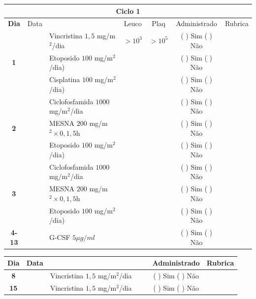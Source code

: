 \documentclass[11pt,a4paper,oldfontcommands]{memoir}
\begin{document}
\begin{center}
\begin{longtable}{p{1cm}c|p{5cm}|p{1.5cm}p{1.5cm}|c|c}
	\hline
	\multicolumn{7}{c}{Ciclo 1} \\
	\hline
	\multicolumn{1}{c|}{\multirow{1}{*}{\textbf{Dia}}}&{Data}&{}&\multicolumn{1}{c|}{Leuco}&\multicolumn{1}{c|}{Plaq}&{Administrado}&{Rubrica} \\
    \hline
    \multicolumn{1}{c|}{\multirow{3}{*}{\textbf{1}}}&&{Vincristina \(1,5\) mg/m\(^2\)/dia}&\multicolumn{1}{c|}{\(>10^3\)}&\multicolumn{1}{c|}{\(>10^5\)}&{(  ) Sim (  ) Não}&\\
    \cline{4-5}
    \multicolumn{1}{c|}{}&&{Etoposido \(100\) mg/m\(^2\)/dia)}&&&{(  ) Sim (  ) Não}&\\
    \cline{4-5}
    \multicolumn{1}{c|}{}&\multirow{1}{*}{}&{Cisplatina \(100\) mg/m\(^2\)/dia)}&&&{(  ) Sim (  ) Não}&\\
    \hline
    \multicolumn{1}{c|}{\multirow{3}{*}{\textbf{2}}}&&{Ciclofosfamida \(1000\) mg/m\(^2\)/dia}&{}&&{(  ) Sim (  ) Não}&\\
    \multicolumn{1}{c|}{}&&{MESNA \(200\) mg/m\(^2 \times 0,1,5\)h}&&&{(  ) Sim (  ) Não}&\\
    \multicolumn{1}{c|}{}&&{Etoposido \(100\) mg/m\(^2\)/dia)}&&&{(  ) Sim (  ) Não}&\\
    \hline
    \multicolumn{1}{c|}{\multirow{3}{*}{\textbf{3}}}&&{Ciclofosfamida \(1000\) mg/m\(^2\)/dia}&{}&&{(  ) Sim (  ) Não}&\\
    \multicolumn{1}{c|}{}&&{MESNA \(200\) mg/m\(^2 \times 0,1,5\)h}&&&{(  ) Sim (  ) Não}&\\
    \multicolumn{1}{c|}{}&\multirow{1}{*}{}&{Etoposido \(100\) mg/m\(^2\)/dia)}&{}&&{(  ) Sim (  ) Não}&\\
    \hline
    \multicolumn{1}{c|}{\textbf{4-13}}&&{G-CSF \(5 \mu g/ml\) }&&&{(  ) Sim (  ) Não}&\\
    \hline
\end{longtable}
\begin{longtable}{p{1cm}c|p{4cm}|p{2cm}p{2cm}|c|c}
	\hline
	\multicolumn{1}{c|}{\multirow{1}{*}{\textbf{Dia}}}&{Data}&{}&{}&&{Administrado}&{Rubrica} \\
    \hline
    \multicolumn{1}{c|}{\textbf{8}}&&{Vincristina \(1,5\) mg/m\(^2\)/dia}&\multicolumn{1}{c}{}&&{(  ) Sim (  ) Não}&\\
    \hline
    \multicolumn{1}{c|}{\textbf{15}}&&{Vincristina \(1,5\) mg/m\(^2\)/dia}&\multicolumn{1}{c}{}&&{(  ) Sim (  ) Não}&\\
    \hline
\end{longtable}


\end{center}
\end{document}

